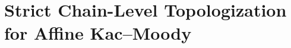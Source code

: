 %
%
%

\chapter{Strict Chain-Level Topologization for Affine Kac--Moody}
\label{chap:topologization-chain-level-platonic}

